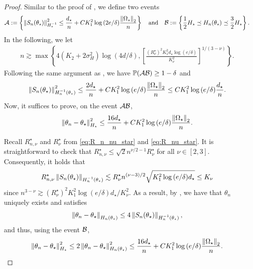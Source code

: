 \begin{proof}
    Similar to the proof of , we define two events
    \begin{align*}
        \begin{split}
            \mathcal{A} := \left\{ \left\lVert S_n(\theta_\star) \right\rVert_{H_\star^{-1}}^{2} \le \frac{d_\star}n + CK_{1}^2 \log{(2e / \delta)} \frac{\left\lVert \Omega_\star \right\rVert_2}{n} \right\} \quad \mbox{and} \quad \mathcal{B} := \left\{ \frac12 H_\star \preceq H_n(\theta_\star) \preceq \frac32 H_\star \right\}.
        \end{split}
    \end{align*}
    In the following, we let
    \begin{align*}
        n \gtrsim \max\left\{ 4(K_2 + 2\sigma_H^2) \log{(4d/\delta)}, \left[\frac{(R_\nu^\star)^2 K_1^2 d_\star \log{(e/\delta)}}{K_\nu^2}\right]^{1/(3-\nu)} \right\}.
    \end{align*}
    Following the same argument as , we have $\operatorname{\mathbb P}(\mathcal{A} \mathcal{B}) \ge 1 - \delta$ and
    \begin{align*}
        \left\lVert S_n(\theta_\star) \right\rVert_{H_n^{-1}(\theta_\star)}^2 \le \frac{2 d_\star}{n} + C K_{1}^2 \log{(e / \delta)} \frac{\left\lVert \Omega_\star \right\rVert_2}{n} \le C K_{1}^2 \log{(e / \delta)} \frac{d_\star}{n}.
    \end{align*}
    Now, it suffices to prove, on the event $\mathcal{A} \mathcal{B}$,
    \begin{align*}
        \left\lVert \theta_n - \theta_\star \right\rVert_{H_\star}^2 \le \frac{16 d_\star}{n} + C K_{1}^2 \log{(e / \delta)} \frac{\left\lVert \Omega_\star \right\rVert_2}{n}.
    \end{align*}
    
    Recall $R_{n, \nu}^\star$ and $R_{\nu}^\star$ from \eqref{eq:R_n_nu_star} and \eqref{eq:R_nu_star}.
    It is straightforward to check that $R_{n, \nu}^\star \le \sqrt{2} n^{\nu/2-1} R_\nu^\star$ for all $\nu \in [2, 3]$.
    Consequently, it holds that
    \begin{align*}
        R_{n,\nu}^\star \left\lVert S_n(\theta_\star) \right\rVert_{H_n^{-1}(\theta_\star)} \lesssim R_\nu^\star n^{(\nu - 3)/2} \sqrt{K_{1}^2 \log{(e / \delta)} d_\star} \le K_\nu
    \end{align*}
    since $n^{3-\nu} \gtrsim (R_\nu^\star)^2 K_1^2 \log{(e / \delta)} d_\star/ K_\nu^2$.
    As a result, by , we have that $\theta_n$ uniquely exists and satisfies
    \begin{align*}
        \left\lVert \theta_n - \theta_\star \right\rVert_{H_n(\theta_\star)} \le 4 \left\lVert S_n(\theta_\star) \right\rVert_{H_n^{-1}(\theta_\star)},
    \end{align*}
    and thus, using the event $\mathcal{B}$,
    \begin{align*}
        \left\lVert \theta_n - \theta_\star \right\rVert_{H_\star}^2
        \le 2\left\lVert \theta_n - \theta_\star \right\rVert_{H_n(\theta_\star)}^2
        \le \frac{16 d_\star}{n} + C K_{1}^2 \log{(e / \delta)} \frac{\left\lVert \Omega_\star \right\rVert_2}{n}.
    \end{align*}
\end{proof}


